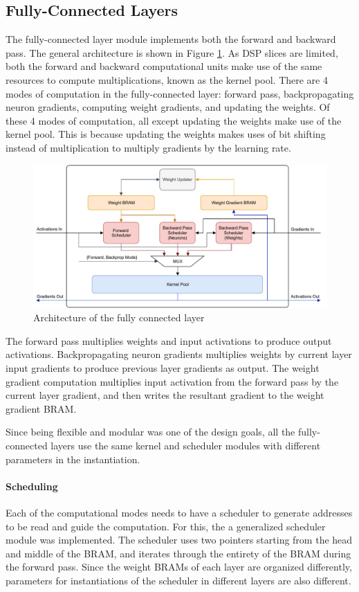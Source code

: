 \subsection{Fully-Connected Layers}
The fully-connected layer module implements both the forward and backward pass. The general architecture is shown in Figure \ref{fc-arch}. As DSP slices are limited, both the forward and backward computational units make use of the same resources to compute multiplications, known as the kernel pool. There are 4 modes of computation in the fully-connected layer: forward pass, backpropagating neuron gradients, computing weight gradients, and updating the weights. Of these 4 modes of computation, all except updating the weights make use of the kernel pool. This is because updating the weights makes uses of bit shifting instead of multiplication to multiply gradients by the learning rate.
\begin{figure}
	\centering 
	\includegraphics[width=\textwidth]{figures/fully_connected_arch}
	\caption{Architecture of the fully connected layer}\label{fc-arch}
\end{figure}

The forward pass multiplies weights and input activations to produce output activations. Backpropagating neuron gradients multiplies weights by current layer input gradients to produce previous layer gradients as output. The weight gradient computation multiplies input activation from the forward pass by the current layer gradient, and then writes the resultant gradient to the weight gradient BRAM. 

Since being flexible and modular was one of the design goals, all the fully-connected layers use the same kernel and scheduler modules with different parameters in the instantiation.

\paragraph{Scheduling}
Each of the computational modes needs to have a scheduler to generate addresses to be read and guide the computation. For this, the a generalized scheduler module was implemented. The scheduler uses two pointers starting from the head and middle of the BRAM, and iterates through the entirety of the BRAM during the forward pass. Since the weight BRAMs of each layer are organized differently, parameters for instantiations of the scheduler in different layers are also different.

